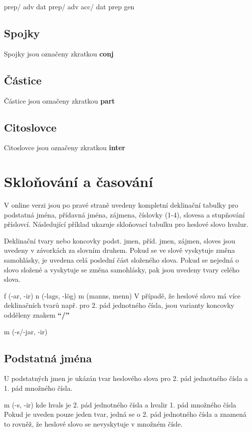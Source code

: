  {\small{ prep/ adv dat}}
 {\small{ prep/ adv acc/ dat}}
 {\small{ prep gen}}

\subsection{Spojky}
Spojky jsou označeny zkratkou \textbf{conj}

\subsection{Částice}
Částice jsou označeny zkratkou \textbf{part}

\subsection{Citoslovce}
Citoslovce jsou označeny zkratkou \textbf{inter}


\section{Skloňování a časování}
V online verzi jsou po pravé straně uvedeny kompletní deklinační tabulky pro podstatná jména, přídavná jména, zájmena, číslovky (1-4), slovesa a stupňování příslovcí. Následující příklad ukazuje skloňovací tabulku pro heslové slovo hvalur.

Deklinační tvary nebo koncovky podst. jmen, příd. jmen, zájmen, sloves jsou uvedeny v závorkách za slovním druhem. Pokud se ve slově vyskytuje změna samohlásky, je uvedena celá poslední část složeného slova. Pokud se nejedná o slovo složené a vyskytuje se změna samohlásky, pak jsou uvedeny tvary celého slova.


 {\small{ f (-ar, -ir)}}
 {\small{ n (-lags, -lög) }}
 {\small{ m (manns, menn)}}
V případě, že heslové slovo má více deklinačních tvarů např. pro 2. pád jednotného čísla, jsou varianty koncovky odděleny znakem \textbf{“/”}


 {\small{ m (-s/-jar, -ir)}}

\subsection{Podstatná jména}
U podstatných jmen je ukázán tvar heslového slova pro 2. pád jednotného čísla a 1. pád množného čísla.

	
 {\small{ m (-s, -ir)}}
kde hvals je 2. pád jednotného čísla a hvalir 1. pád množného čísla
 Pokud je uveden pouze jeden tvar, jedná se o 2. pád jednotného čísla a znamená to rovněž, že heslové slovo se nevyskytuje v množném čísle.


